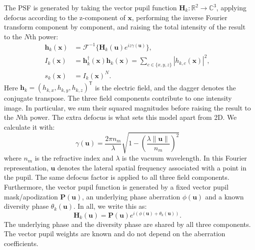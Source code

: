\documentclass{article}
\begin{document}
The PSF is generated by taking the vector pupil function $\mathbf{H}_k: \mathbb{R}^2 \to \mathbb{C}^3$, applying defocus according to the z-component of $\mathbf{x}$, performing the inverse Fourier transform component by component, and raising the total intensity of the result to the $N$th power:
\begin{align}
\mathbf{h}_k(\mathbf{x}) &= \mathcal{F}^{-1} \{\mathbf{H}_k(\mathbf{u}) e^{i z \gamma(\mathbf{u})}\}, \\
I_k(\mathbf{x}) &= \mathbf{h}_k^\dagger(\mathbf{x})\mathbf{h}_k(\mathbf{x})
= \sum_{c\in\{x,y,z\}} |h_{k,c}(\mathbf{x})|^2, \\
s_k(\mathbf{x}) &= I_k(\mathbf{x})^N.
\end{align}
Here $\mathbf{h}_k=(h_{k,x},h_{k,y},h_{k,z})^{\mathsf T}$ is the electric field, and the dagger denotes the conjugate transpose. The three field components contribute to one intensity image. In particular, we sum their squared magnitudes before raising the result to the $N$th power.
The extra defocus is what sets this model apart from 2D. We calculate it with:
\begin{equation}
\gamma(\mathbf{u}) = \frac{2\pi n_m}{\lambda} \sqrt{1-  \left(\frac{\lambda \|\mathbf{u}\|}{n_m} \right)^2}
\end{equation}
where $n_m$ is the refractive index and $\lambda$ is the vacuum wavelength. In this Fourier representation, $\mathbf{u}$ denotes the lateral spatial frequency associated with a point in the pupil. The same defocus factor is applied to all three field components.
Furthermore, the vector pupil function is generated by a fixed vector pupil mask/apodization $\mathbf{P}(\mathbf{u})$, an underlying phase aberration $\phi(\mathbf{u})$ and a known diversity phase $\theta_k(\mathbf{u})$. In all, we write this as:
\begin{equation}
\mathbf{H}_k(\mathbf{u}) = \mathbf{P}(\mathbf{u}) e^{i \left(\phi(\mathbf{u}) + \theta_k(\mathbf{u})\right)}.
\end{equation}
The underlying phase and the diversity phase are shared by all three components. The vector pupil weights are known and do not depend on the aberration coefficients.
\end{document}
